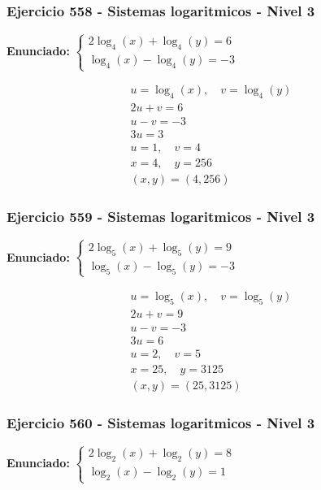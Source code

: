 \documentclass[12pt,a4paper]{article}
\begin{document}
\subsubsection*{Ejercicio 558 - Sistemas logaritmicos - Nivel 3}
\textbf{Enunciado:} \(\begin{cases} 2\log_{4}\left(x\right)+\log_{4}\left(y\right)=6\\ \log_{4}\left(x\right)-\log_{4}\left(y\right)=-3\end{cases}\)

\[
\begin{aligned}
u=\log_{4}\left(x\right),\quad v=\log_{4}\left(y\right)\\
2u+v=6\\
u-v=-3\\
3u=3\\
u=1,\quad v=4\\
x=4,\quad y=256\\
\boxed{(x,y)=(4,256)}
\end{aligned}
\]


\subsubsection*{Ejercicio 559 - Sistemas logaritmicos - Nivel 3}
\textbf{Enunciado:} \(\begin{cases} 2\log_{5}\left(x\right)+\log_{5}\left(y\right)=9\\ \log_{5}\left(x\right)-\log_{5}\left(y\right)=-3\end{cases}\)

\[
\begin{aligned}
u=\log_{5}\left(x\right),\quad v=\log_{5}\left(y\right)\\
2u+v=9\\
u-v=-3\\
3u=6\\
u=2,\quad v=5\\
x=25,\quad y=3125\\
\boxed{(x,y)=(25,3125)}
\end{aligned}
\]


\subsubsection*{Ejercicio 560 - Sistemas logaritmicos - Nivel 3}
\textbf{Enunciado:} \(\begin{cases} 2\log_{2}\left(x\right)+\log_{2}\left(y\right)=8\\ \log_{2}\left(x\right)-\log_{2}\left(y\right)=1\end{cases}\)
\end{document}
